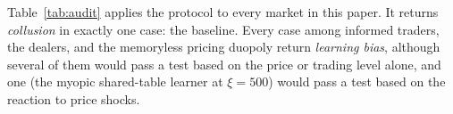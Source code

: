 Table~\ref{tab:audit} applies the protocol to every market in this paper. It
returns \emph{collusion} in exactly one case: the \citet{calvano2020}
baseline. Every case among informed traders, the dealers, and the
memoryless pricing duopoly return \emph{learning bias}, although several of them would pass a
test based on the price or trading level alone, and one (the myopic
shared-table learner at $\xi=500$) would pass a test based on the reaction to
price shocks.

\begin{table}[t]
  \centering
  \caption{The audit protocol applied to each market. $\Delta$: profit-based
  (Bertrand, dealers) or intensity-based (Kyle). Deviation: does the rival
  respond and does deviating lose? Placebo: does a learner that cannot punish
  reproduce the outcome? Rule: does the outcome change with the learning
  rule (counterfactual updates or step size)?}
  \label{tab:audit}
  \resizebox{\linewidth}{!}{}
\end{table}

